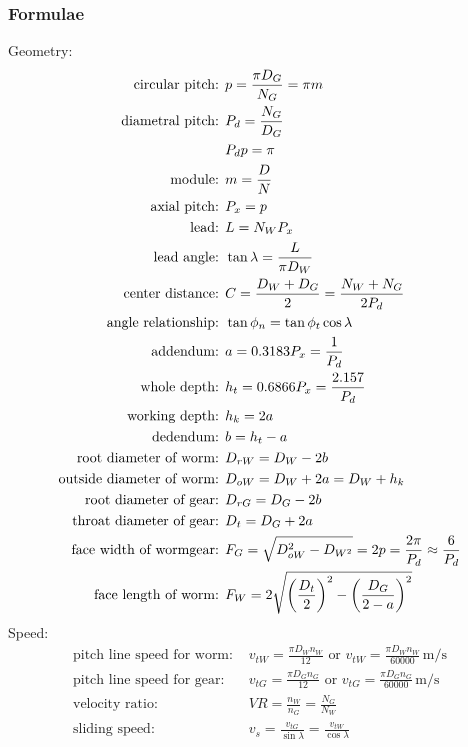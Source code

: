 \documentclass[11pt, fleqn]{article}
\begin{document}
\subsubsection{Formulae}
Geometry:
\begin{align*}
    \text{circular pitch: }&p=\frac{\pi D_G}{N_G}=\pi m\\
    \text{diametral pitch: }&P_d=\frac{N_G}{D_G}\\
    &P_dp=\pi\\
    \text{module: }&m=\frac{D}{N}\\
    \text{axial pitch: }&P_x=p\\
    \text{lead: }&L=N_WP_x\\
    \text{lead angle: }&\tan\lambda=\frac{L}{\pi D_W}\\
    \text{center distance: }& C=\frac{D_W+D_G}{2}=\frac{N_W+N_G}{2P_d}\\
    \text{angle relationship: }&\tan\phi_n=\tan\phi_t\cos\lambda\\
    \text{addendum: }&a=0.3183P_x=\frac{1}{P_d}\\
    \text{whole depth: }&h_t=0.6866P_x=\frac{2.157}{P_d}\\
    \text{working depth: }&h_k=2a\\
    \text{dedendum: }&b=h_t-a\\
    \text{root diameter of worm: }&D_{rW}=D_W-2b\\
    \text{outside diameter of worm: }&D_{oW}=D_W+2a=D_W+h_k\\
    \text{root diameter of gear: }&D_{rG}=D_G-2b\\
    \text{throat diameter of gear: }&D_t=D_G+2a\\
    \text{face width of wormgear: }&F_G=\sqrt{D_{oW}^2-D_{W^2}}=2p=\frac{2\pi}{P_d}\approx \frac{6}{P_d}\\
    \text{face length of worm: }&F_W=2\sqrt{\left( \frac{D_t}{2} \right)^2-\left( \frac{D_G}{2-a} \right)^2}
\end{align*}
Speed:
\begin{align*}
    \text{pitch line speed for worm: }&v_{tW}=\frac{\pi D_Wn_W}{12}\text{ or }v_{tW}=\frac{\pi D_Wn_W}{60000}\,\mathrm{m/s}\\
    \text{pitch line speed for gear: }&v_{tG}=\frac{\pi D_Gn_G}{12}\text{ or }v_{tG}=\frac{\pi D_Gn_G}{60000}\,\mathrm{m/s}\\
    \text{velocity ratio: }&VR=\frac{n_W}{n_G}=\frac{N_G}{N_W}\\
    \text{sliding speed: }&v_s=\frac{v_{tG}}{\sin\lambda}=\frac{v_{tW}}{\cos\lambda}
\end{align*}
\end{document}
